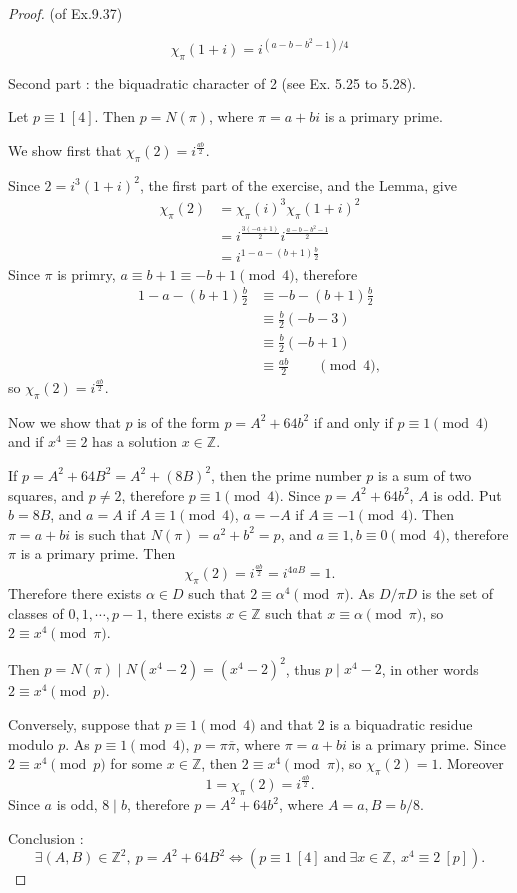 \documentclass[11pt,a4paper]{article}
\newcommand{\Z}{\mathbb{Z}}
\begin{document}
\begin{proof}{(of Ex.9.37)}
\begin{enumerate}
$$\chi_\pi(1+i) = i^{(a-b-b^2-1)/4}$$

\end{enumerate}

\bigskip

Second part : the biquadratic character of 2 (see Ex. 5.25 to 5.28).

Let $p\equiv 1 \ [4]$. Then $p=N(\pi)$, where $\pi = a+bi$ is a primary prime.

We show first that $\chi_\pi(2)=i^\frac{ab}{2}$.

Since $2 = i^3(1+i)^2$, the first part of the exercise, and the Lemma, give
\begin{align*}
\chi_\pi(2) &= \chi_\pi(i)^3 \chi_\pi(1+i)^2\\
&=i^\frac{3(-a+1)}{2} i ^\frac{a-b-b^2-1}{2}\\
&=i^{1-a -(b+1)\frac{b}{2}}
\end{align*}
Since $\pi$ is primry, $a\equiv b+1 \equiv -b+1\pmod 4$, therefore
\begin{align*}
1-a -(b+1)\frac{b}{2} &\equiv - b -(b+1)\frac{b}{2}\\
&\equiv \frac{b}{2}(-b-3)\\
&\equiv \frac{b}{2}(-b+1)\\
&\equiv \frac{ab}{2} \qquad \pmod 4,
\end{align*}
so $\chi_\pi(2) = i^\frac{ab}{2} $.
 
   \bigskip
   
 Now we show that $p$ is of the form $p=A^2+64b^2$ if and only if $p\equiv 1 \pmod 4$ and if $x^4 \equiv 2$ has a solution $x \in \Z$.
 
 If $p=A^2+64B^2 = A^2 + (8B)^2$, then the prime number $p$ is a sum of two squares, and $p\ne 2$, therefore $p\equiv 1 \pmod 4$. Since $p=A^2 + 64b^2$, $A$ is odd. Put $b = 8B$, and $a = A$ if $A\equiv 1 \pmod 4$, $a = -A$ if $A\equiv -1 \pmod 4$. Then $\pi =a +bi$ is such that $N(\pi) = a^2 +b^2 = p$, and $a\equiv 1, b\equiv 0 \pmod 4$, therefore $\pi$ is a primary prime. Then
 $$\chi_\pi(2) = i^\frac{ab}{2} = i^{4aB} = 1.$$
  Therefore there exists $\alpha \in D$ such that $2\equiv \alpha^4 \pmod \pi$. As $D/\pi D$ is the set of classes of $0,1,\cdots,p-1$, there exists $x\in \Z$ such that $x\equiv \alpha \pmod \pi$, so $2 \equiv x^4 \pmod \pi$.
 
 Then $p = N(\pi) \mid N(x^4-2) = (x^4-2)^2$, thus $p \mid x^4 -2$, in other words $2\equiv x^4 \pmod p$.
   
Conversely, suppose that $p\equiv 1 \pmod 4$ and that $2$ is a biquadratic residue modulo $p$. As $p\equiv 1 \pmod 4$, $p = \pi \overline{\pi}$, where $\pi =a + bi$ is a primary prime. Since $2\equiv x^4 \pmod p$ for some $x \in \Z$, then $2 \equiv x^4 \pmod \pi$, so $\chi_\pi(2)=1$. Moreover
$$1 = \chi_\pi(2) = i^\frac{ab}{2}.$$
Since $a$ is odd, $8 \mid b$, therefore $p=A^2 + 64b^2$, where $A=a, B =b/8$.
  
 Conclusion :
 $$\exists (A,B) \in \Z^2,\ p = A^2+64B^2 \iff (p\equiv 1 \ [4] \ \mathrm{and}\ \exists x \in \Z, \ x^4 \equiv 2 \ [p]).$$
\end{proof}
\end{document}
